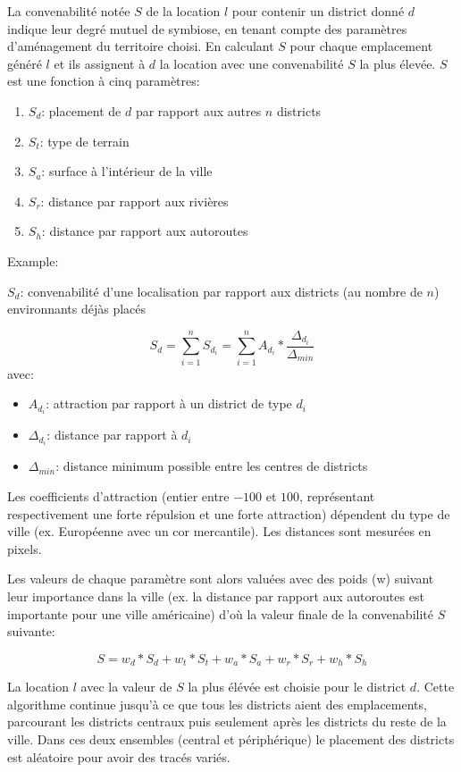 \documentclass[11pt]{article}
\begin{document}
La convenabilité notée $S$ de la location $l$ pour contenir un district donné $d$ indique leur degré mutuel de symbiose, en tenant compte des paramètres d'aménagement du territoire choisi. En calculant $S$ pour chaque emplacement généré $l$ et ils assignent à $d$ la location avec une convenabilité $S$ la plus élevée.
$S$ est une fonction à cinq paramètres:
\begin{enumerate}
\item $S_d$: placement de $d$ par rapport aux autres $n$ districts
\item $S_t$: type de terrain
\item $S_a$: surface à l'intérieur de la ville
\item $S_r$: distance par rapport aux rivières
\item $S_h$: distance par rapport aux autoroutes\newline
\end{enumerate}

Example: 

$S_d$: convenabilité d'une localisation par rapport aux districts (au nombre de $n$) environnants déjàs placés

\begin{equation}
S_d = \sum_{i=1}^n S_{d_i} = \sum_{i=1}^n A_{d_i}  \ast \frac{\Delta_{d_i}}{\Delta_{min}}
\end{equation}
avec:\newline
\begin{itemize}
\item $A_{d_i}$: attraction par rapport à un district de type $d_i$
\item $\Delta_{d_i}$: distance par rapport à $d_i$
\item $\Delta_{min}$: distance minimum possible entre les centres de districts\newline
\end{itemize}

Les coefficients d'attraction (entier entre $-100$ et $100$, représentant respectivement une forte répulsion et une forte attraction) dépendent du type de ville (ex. Européenne avec un cor mercantile).
Les distances sont mesurées en pixels.

Les valeurs de chaque paramètre sont alors valuées avec des poids (w) suivant leur importance dans la ville (ex. la distance par rapport aux autoroutes est importante pour une ville américaine) d'où la valeur finale de la convenabilité $S$ suivante:

\begin{equation}
S = w_d \ast S_d + w_t \ast S_t + w_a \ast S_a + w_r \ast S_r + w_h \ast S_h
\end{equation}

La location $l$ avec la valeur de $S$ la plus élévée est choisie pour le district $d$. Cette algorithme continue jusqu'à ce que tous les districts aient des emplacements, parcourant les districts centraux puis seulement après les districts du reste de la ville. Dans ces deux ensembles (central et périphérique) le placement des districts est aléatoire pour avoir des tracés variés.
\end{document}
